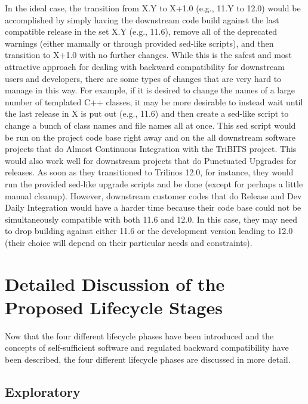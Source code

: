 \documentclass[11pt]{SANDreport}
\begin{document}
In the ideal case, the transition from X.Y to X+1.0 (e.g., 11.Y to 12.0) would be accomplished by simply having the downstream code build against the last compatible release in the set X.Y (e.g., 11.6), remove all of the deprecated warnings (either manually or through provided sed-like scripts), and then transition to X+1.0 with no further changes.  While this is the safest and most attractive approach for dealing with backward compatibility for downstream users and developers, there are some types of changes that are very hard to manage in this way.  For example, if it is desired to change the names of a large number of templated C++ classes, it may be more desirable to instead wait until the last release in X is put out (e.g., 11.6) and then create a sed-like script to change a bunch of class names and file names all at once.  This sed script would be run on the project code base right away and on the all downstream software projects that do Almost Continuous Integration {}\cite{SoftwareIntegrationforCSE09} with the TriBITS project.  This would also work well for downstream projects that do Punctuated Upgrades {}\cite{SoftwareIntegrationforCSE09} for releases.  As soon as they transitioned to Trilinos 12.0, for instance, they would run the provided sed-like upgrade scripts and be done (except for perhaps a little manual cleanup).  However, downstream customer codes that do Release and Dev Daily Integration {}\cite{SoftwareIntegrationforCSE09} would have a harder time because their code base could not be simultaneously compatible with both 11.6 and 12.0.  In this case, they may need to drop building against either 11.6 or the development version leading to 12.0 (their choice will depend on their particular needs and constraints).


%
{}\section{Detailed Discussion of the Proposed Lifecycle Stages}
\label{sec:detained_lifecycle_stages}
%

Now that the four different lifecycle phases have been introduced and the concepts of self-sufficient software and regulated backward compatibility have been described, the four different lifecycle phases are discussed in more detail.


%
{}\subsection{Exploratory}
\label{sec:exploratory_code}
%
\end{document}
